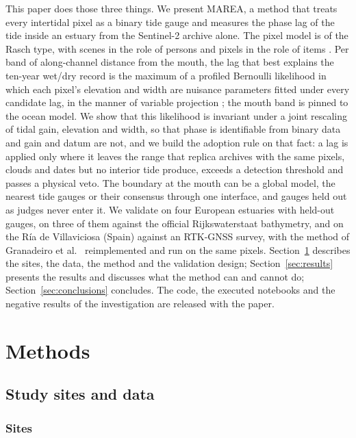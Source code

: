 \documentclass[final,5p,times,number]{elsarticle}
\begin{document}
This paper does those three things. We present MAREA, a method that treats
every intertidal pixel as a binary tide gauge and measures the phase lag of
the tide inside an estuary from the Sentinel-2 archive alone. The pixel
model is of the Rasch type, with scenes in the role of persons and pixels
in the role of items \citep{rasch1960,engelhard2021}. Per band of
along-channel distance from the mouth, the lag that best explains the
ten-year wet/dry record is the maximum of a profiled Bernoulli likelihood
in which each pixel's elevation and width are nuisance parameters fitted
under every candidate lag, in the manner of variable projection
\citep{golub1973,kaufman1975}; the mouth band is pinned to the ocean
model. We
show that this likelihood is invariant under a joint rescaling of tidal
gain, elevation and width, so that phase is identifiable from binary data
and gain and datum are not, and we build the adoption rule on that fact: a
lag is applied only where it leaves the range that replica archives with
the same pixels, clouds and dates but no interior tide produce, exceeds a
detection threshold and passes a physical veto. The boundary at the mouth
can be a global model, the nearest tide gauges or their consensus through
one interface, and gauges held out as judges never enter it. We validate
on four European estuaries with held-out gauges, on three of them against
the official Rijkswaterstaat bathymetry, and on the R\'ia de Villaviciosa
(Spain) against an RTK-GNSS survey, with the method of
Granadeiro et al.~\cite{granadeiro2021} reimplemented and run on the same pixels.
Section~\ref{sec:methods} describes the sites, the data, the method and
the validation design; Section~\ref{sec:results} presents the results and
discusses what the method can and cannot do; Section~\ref{sec:conclusions}
concludes. The code, the executed notebooks and the
negative results of the investigation are released with the paper.

\section{Methods}\label{sec:methods}

\subsection{Study sites and data}\label{sec:sites}

\subsubsection{Sites}
\end{document}
